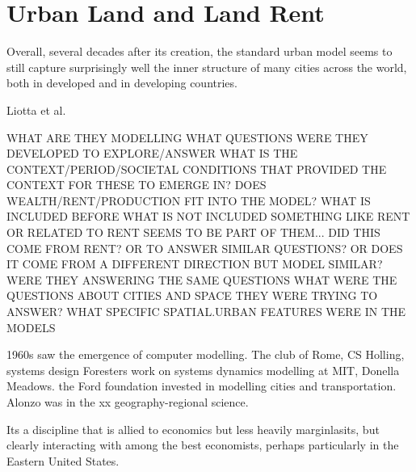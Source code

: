 \chapter{Urban Land and Land Rent} \label{chapter-space}

\epigraph{Overall, several decades after its creation, the standard urban model seems to still capture surprisingly well the inner structure of many cities across the world, both in developed and in developing countries.}{Liotta et al. 
 \cite{liottaTestingMonocentricStandard2022}}


WHAT ARE THEY MODELLING
WHAT QUESTIONS WERE THEY DEVELOPED TO EXPLORE/ANSWER
WHAT IS THE CONTEXT/PERIOD/SOCIETAL CONDITIONS THAT PROVIDED THE CONTEXT FOR THESE TO EMERGE IN? 
DOES WEALTH/RENT/PRODUCTION FIT INTO THE MODEL? WHAT IS INCLUDED BEFORE WHAT IS NOT INCLUDED
SOMETHING LIKE RENT OR RELATED TO RENT SEEMS TO BE PART OF THEM... DID THIS COME FROM RENT? OR TO ANSWER SIMILAR QUESTIONS? OR DOES IT COME FROM A DIFFERENT DIRECTION BUT MODEL SIMILAR? 
WERE THEY ANSWERING THE SAME QUESTIONS
WHAT WERE THE QUESTIONS ABOUT CITIES AND SPACE THEY WERE TRYING TO ANSWER? 
WHAT SPECIFIC SPATIAL.URBAN FEATURES WERE IN THE MODELS


1960s saw the emergence of computer modelling. The club of Rome, CS Holling, 
systems design
Foresters work on systems dynamics modelling at MIT, Donella Meadows.
the Ford foundation invested in modelling cities and transportation. 
Alonzo was in the xx geography-regional science. 

Its a discipline that is allied to economics but less heavily marginlasits, but clearly interacting with among the best economists, perhaps particularly in the Eastern United States.



